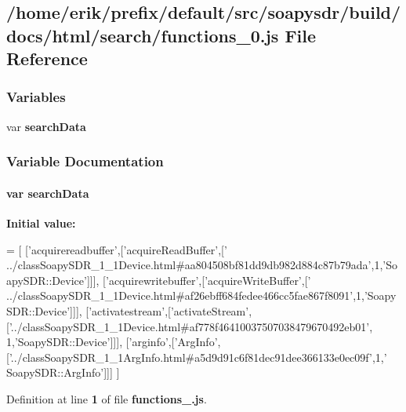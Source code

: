 \subsection{/home/erik/prefix/default/src/soapysdr/build/docs/html/search/functions\+\_\+0.js File Reference}
\label{functions__0_8js}
\subsubsection*{Variables}
\begin{DoxyCompactItemize}
\item 
var {\bf search\+Data}
\end{DoxyCompactItemize}


\subsubsection{Variable Documentation}
\paragraph[{search\+Data}]{\setlength{\rightskip}{0pt plus 5cm}var search\+Data}\label{functions__0_8js_ad01a7523f103d6242ef9b0451861231e}
{\bfseries Initial value\+:}
\begin{DoxyCode}
=
[
  [\textcolor{stringliteral}{'acquirereadbuffer'},[\textcolor{stringliteral}{'acquireReadBuffer'},[\textcolor{stringliteral}{'
      ../classSoapySDR\_1\_1Device.html#aa804508bf81dd9db982d884c87b79ada'},1,\textcolor{stringliteral}{'SoapySDR::Device'}]]],
  [\textcolor{stringliteral}{'acquirewritebuffer'},[\textcolor{stringliteral}{'acquireWriteBuffer'},[\textcolor{stringliteral}{'
      ../classSoapySDR\_1\_1Device.html#af26ebff684fedee466cc5fae867f8091'},1,\textcolor{stringliteral}{'SoapySDR::Device'}]]],
  [\textcolor{stringliteral}{'activatestream'},[\textcolor{stringliteral}{'activateStream'},[\textcolor{stringliteral}{'../classSoapySDR\_1\_1Device.html#af778f46410037507038479670492eb01'},
      1,\textcolor{stringliteral}{'SoapySDR::Device'}]]],
  [\textcolor{stringliteral}{'arginfo'},[\textcolor{stringliteral}{'ArgInfo'},[\textcolor{stringliteral}{'../classSoapySDR\_1\_1ArgInfo.html#a5d9d91c6f81dec91dee366133e0ec09f'},1,\textcolor{stringliteral}{'
      SoapySDR::ArgInfo'}]]]
]
\end{DoxyCode}


Definition at line {\bf 1} of file {\bf functions\+\_.\+js}.

